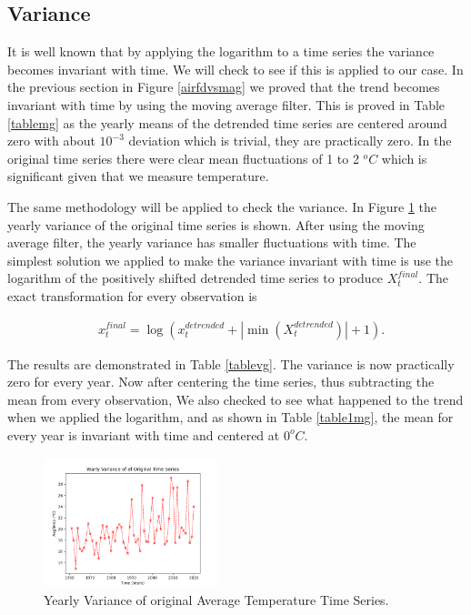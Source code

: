 \documentclass[conference]{IEEEtran}
\begin{document}
\subsection{Variance}

It is well known that by applying the logarithm to a time series the variance becomes invariant with time. We will check to see if this is applied to our case. In the previous section in Figure \ref{airfdvsmag} we proved that the trend becomes invariant with time by using the moving average filter. This is proved in Table \ref{tablemg} as the yearly means of the detrended time series are centered around zero with about $10^{-3}$ deviation which is trivial, they are practically zero. In the original time series there were clear mean fluctuations of 1 to 2 $^o C$ which is significant given that we measure temperature. 
\par The same methodology will be applied to check the variance. In Figure \ref{tempvg} the yearly variance of the original time series is shown. After using the moving average filter, the yearly variance has smaller fluctuations with time. The simplest solution we applied to make the variance invariant with time is use the logarithm of the positively shifted detrended time series to produce $X_t^{final}$. The exact transformation for every observation is

\begin{equation}\label{logmasg}
    \begin{split}
        & x_t^{final} = \log\left(x_t^{detrended}+\left|\min(X_t^{detrended})\right|+1\right).
    \end{split}
\end{equation}

The results are demonstrated in Table \ref{tablevg}. The variance is now practically zero for every year. Now after centering the time series, thus subtracting the mean from every observation, We also checked to see what happened to the trend when we applied the logarithm, and as shown in Table \ref{table1mg}, the mean for every year is invariant with time and centered at $0 ^o C$.

\begin{figure}[ht]
    \centering
    \includegraphics[width=0.45\textwidth]{Figures/GlasnevinLin/Yearly Variance of of Original Time Series.png}
    \caption{Yearly Variance of original Average Temperature Time Series.}
    \label{tempvg}
\end{figure}
\end{document}
